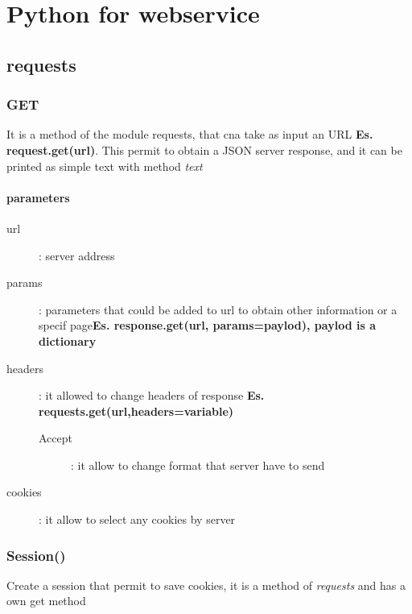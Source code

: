 \documentclass{article}
\begin{document}
\section{Python for webservice}
                \subsection{requests}
                                \subsubsection{GET}
                                    It is a method of the module requests, that cna take as input an URL \textbf{Es. request.get(url)}. This permit to obtain a JSON server response, and it can be printed as simple text with method \textit{text}
                                    \paragraph{parameters}
                                        \begin{description}
                                            \item [url] : server address
                                            \item [params] : parameters that could be added to url to obtain other information or a specif page\textbf{Es. response.get(url, params=paylod), paylod is a dictionary}
                                            \item [headers]: it allowed to change headers of response \textbf{Es. requests.get(url,headers=variable)}
                                                  \begin{description}
                                                    \item[Accept]: it allow to change format that server have to send 
                                                    \item[]  
                                                  \end{description}  
                                            \item[cookies]: it allow to select any cookies by server
                                        \end{description}
                                \subsubsection{Session()}
                                    Create a session that permit to save cookies, it is a method of \textit{requests} and has a own get method
\end{document}

